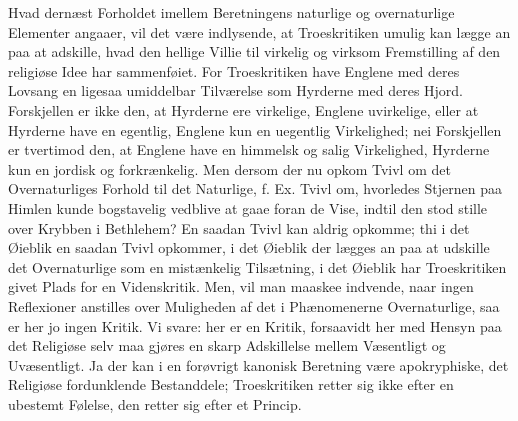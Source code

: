 \documentclass[12pt]{book}
\newcommand{\opage}[1]{\marginnote{\footnotesize\textit{[#1]}}}
\begin{document}
\opage{60}\setcounter{footnote}{0}%
Hvad dernæst Forholdet imellem Beretningens naturlige
og overnaturlige Elementer angaaer, vil det være indlysende,
at Troeskritiken umulig kan lægge an paa at adskille, hvad
den hellige Villie til virkelig og virksom Fremstilling af den
religiøse Idee har sammenføiet. For Troeskritiken have
Englene med deres Lovsang en ligesaa umiddelbar Tilværelse
som Hyrderne med deres Hjord. Forskjellen er ikke den, at
Hyrderne ere virkelige, Englene uvirkelige, eller at Hyrderne
have en egentlig, Englene kun en uegentlig Virkelighed; nei
Forskjellen er tvertimod den, at Englene have en himmelsk og
salig Virkelighed, Hyrderne kun en jordisk og forkrænkelig.
Men dersom der nu opkom Tvivl om det Overnaturliges
Forhold til det Naturlige, f. Ex. Tvivl om, hvorledes Stjernen
paa Himlen kunde bogstavelig vedblive at gaae foran de Vise,
indtil den stod stille over Krybben i Bethlehem? En saadan
Tvivl kan aldrig opkomme; thi i det Øieblik en saadan Tvivl
opkommer, i det Øieblik der lægges an paa at udskille det
Overnaturlige som en mistænkelig Tilsætning, i det Øieblik
har Troeskritiken givet Plads for en Videnskritik. Men,
vil man maaskee indvende, naar ingen Reflexioner anstilles
over Muligheden af det i Phænomenerne Overnaturlige, saa
er her jo ingen Kritik. Vi svare: her er en Kritik, forsaavidt
her med Hensyn paa det Religiøse selv maa gjøres en
skarp Adskillelse mellem Væsentligt og Uvæsentligt. Ja der
kan i en forøvrigt kanonisk Beretning være apokryphiske, det
Religiøse fordunklende Bestanddele; Troeskritiken retter sig
ikke efter en ubestemt Følelse, den retter sig efter et Princip.
\end{document}
